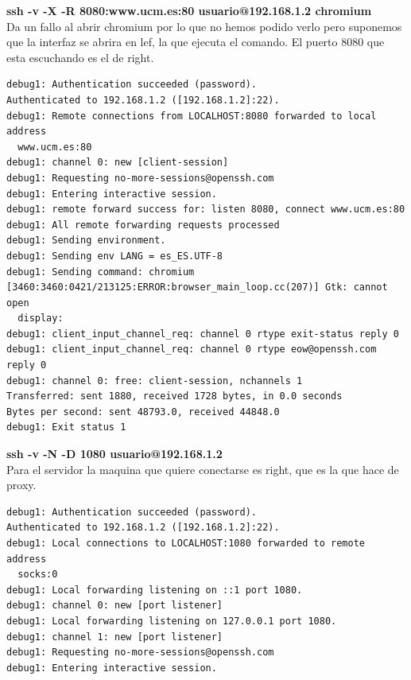 \documentclass[11pt]{article}
\begin{document}
      \bigskip
      \par
      \textbf{ssh -v -X -R 8080:www.ucm.es:80 usuario@192.168.1.2 chromium}\\
      Da un fallo al abrir chromium por lo que no hemos podido verlo pero
      suponemos que la interfaz se abrira en lef, la que ejecuta el comando. El
      puerto 8080 que esta escuchando es el de right.

\begin{lstlisting}
debug1: Authentication succeeded (password).
Authenticated to 192.168.1.2 ([192.168.1.2]:22).
debug1: Remote connections from LOCALHOST:8080 forwarded to local address
  www.ucm.es:80
debug1: channel 0: new [client-session]
debug1: Requesting no-more-sessions@openssh.com
debug1: Entering interactive session.
debug1: remote forward success for: listen 8080, connect www.ucm.es:80
debug1: All remote forwarding requests processed
debug1: Sending environment.
debug1: Sending env LANG = es_ES.UTF-8
debug1: Sending command: chromium
[3460:3460:0421/213125:ERROR:browser_main_loop.cc(207)] Gtk: cannot open
  display:
debug1: client_input_channel_req: channel 0 rtype exit-status reply 0
debug1: client_input_channel_req: channel 0 rtype eow@openssh.com reply 0
debug1: channel 0: free: client-session, nchannels 1
Transferred: sent 1880, received 1728 bytes, in 0.0 seconds
Bytes per second: sent 48793.0, received 44848.0
debug1: Exit status 1
\end{lstlisting}

      \bigskip
      \par
      \textbf{ssh -v -N -D 1080 usuario@192.168.1.2}\\
      Para el servidor la maquina que quiere conectarse es right, que es la que
      hace de proxy.

\begin{lstlisting}
debug1: Authentication succeeded (password).
Authenticated to 192.168.1.2 ([192.168.1.2]:22).
debug1: Local connections to LOCALHOST:1080 forwarded to remote address
  socks:0
debug1: Local forwarding listening on ::1 port 1080.
debug1: channel 0: new [port listener]
debug1: Local forwarding listening on 127.0.0.1 port 1080.
debug1: channel 1: new [port listener]
debug1: Requesting no-more-sessions@openssh.com
debug1: Entering interactive session.
\end{lstlisting}
\end{document}
